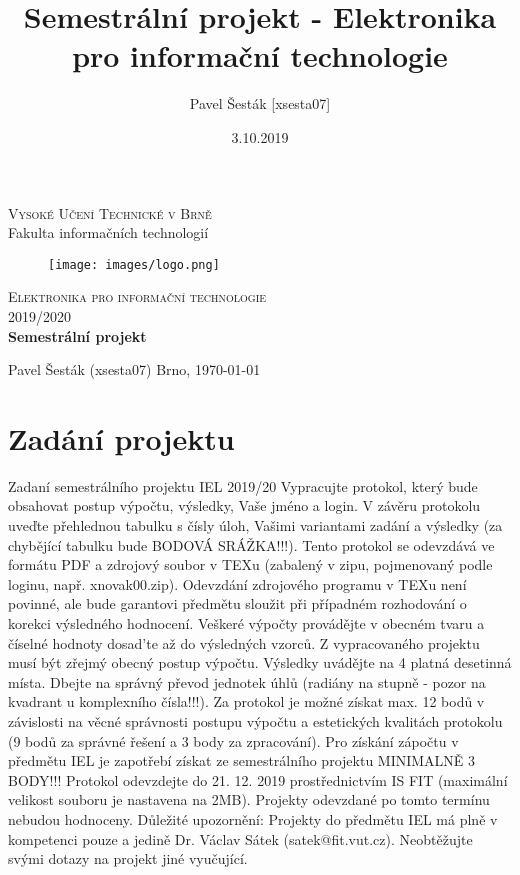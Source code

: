 \documentclass[12pt,a4paper]{article} %
\title{Semestrální projekt - Elektronika pro informační technologie}
\author{Pavel Šesták [xsesta07]}
\date{3.10.2019}
\begin{document}
    \begin{titlepage}
		\begin{center}
			\textsc{\LARGE Vysoké Učení Technické v Brně} \\[0.5cm]
			{\LARGE Fakulta informačních technologií}

			\begin{figure}
				\center\texttt{[image: images/logo.png]}
			\end{figure}

			\vspace{3cm}

			\textsc{\LARGE Elektronika pro informační technologie} \\[0.5cm]
			\textsc{\LARGE 2019/2020} \\[3.5cm]

			\textbf{{\LARGE Semestrální projekt}}
		\end{center}
		\vfill
		\begin{flushleft} 
			\large
			Pavel Šesták (xsesta07)
			\hfill
			Brno, \today
		\end{flushleft}
	\end{titlepage}


\begin{center}
	\tableofcontents %
	\clearpage %
\end{center}
	\section*{Zadání projektu} %
	Zadaní semestrálního projektu IEL 2019/20
	Vypracujte protokol, který bude obsahovat postup výpočtu, výsledky, Vaše
	jméno a login. V závěru protokolu uveďte přehlednou tabulku s čísly úloh,
	Vašimi variantami zadání a výsledky (za chybějící tabulku bude BODOVÁ
	SRÁŽKA!!!).
	Tento protokol se odevzdává ve formátu PDF a zdrojový soubor v TEXu (zabalený v zipu, pojmenovaný podle loginu, např. xnovak00.zip). Odevzdání
	zdrojového programu v TEXu není povinné, ale bude garantovi předmětu
	sloužit při případném rozhodování o korekci výsledného hodnocení.
	Veškeré výpočty provádějte v obecném tvaru a číselné hodnoty dosad’te až
	do výsledných vzorců. Z vypracovaného projektu musí být zřejmý obecný
	postup výpočtu. Výsledky uvádějte na 4 platná desetinná místa. Dbejte na
	správný převod jednotek úhlů (radiány na stupně - pozor na kvadrant u komplexního čísla!!!).
	Za protokol je možné získat max. 12 bodů v závislosti na věcné správnosti postupu výpočtu a estetických kvalitách protokolu (9 bodů za správné řešení a 3
	body za zpracování). Pro získání zápočtu v předmětu IEL je zapotřebí získat
	ze semestrálního projektu MINIMALNĚ 3 BODY!!! Protokol odevzdejte do 21. 12. 2019 prostřednictvím IS FIT (maximální velikost souboru je nastavena na 2MB). Projekty odevzdané po tomto termínu nebudou hodnoceny.
	Důležité upozornění: Projekty do předmětu IEL má plně v kompetenci pouze
	a jedině Dr. Václav Sátek (satek@fit.vut.cz). Neobtěžujte svými dotazy na 
	projekt jiné vyučující.
	\clearpage
\end{document}
